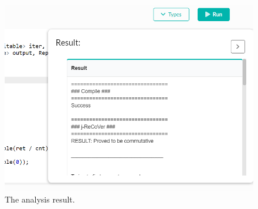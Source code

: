 \begin{figure}
\begin{center}
\includegraphics[width=.8\linewidth]{screenshots/analysis_result}
\caption{The analysis result.}
\label{fig:analysis_result}
\end{center}
\end{figure}

